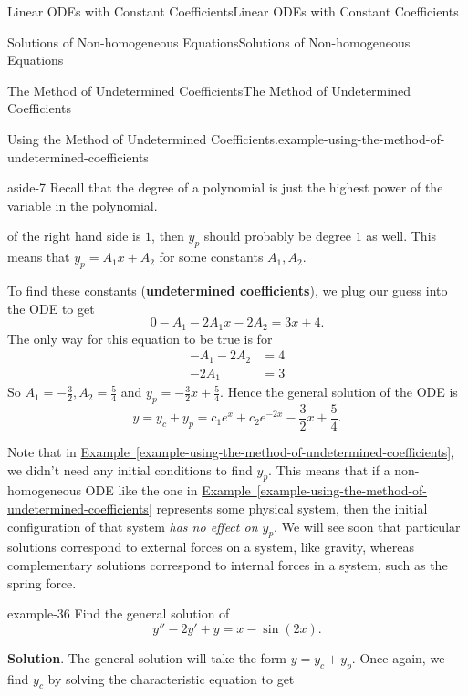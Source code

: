\documentclass[10pt,]{book}
\newcommand{\terminology}[1]{\textbf{#1}}
\numberwithin{equation}{section}
\newcommand{\amp}{&}
\begin{document}
\begin{chapterptx}{Linear ODEs with Constant Coefficients}{}{Linear ODEs with Constant Coefficients}{}{}
\begin{sectionptx}{Solutions of Non-homogeneous Equations}{}{Solutions of Non-homogeneous Equations}{}{}
\begin{subsectionptx}{The Method of Undetermined Coefficients}{}{The Method of Undetermined Coefficients}{}{}
\begin{example}{Using the Method of Undetermined Coefficients.}{example-using-the-method-of-undetermined-coefficients}
\begin{aside}{}{aside-7}
\hypertarget{p-231}{}%
Recall that the degree of a polynomial is just the highest power of the variable in the polynomial.%
\end{aside}
 of the right hand side is \(1\), then \(y_{p}\) should probably be degree \(1\) as well. This means that \(y_{p} = A_{1}x + A_{2}\) for some constants \(A_{1},A_{2}\).%
\par
\hypertarget{p-232}{}%
To find these constants (\terminology{undetermined coefficients}), we plug our guess into the ODE to get%
\begin{equation*}
0 - A_{1} - 2A_{1}x - 2A_{2} = 3x + 4.
\end{equation*}
The only way for this equation to be true is for%
\begin{align*}
-A_{1} - 2A_{2} \amp = 4 \\
-2A_{1} \amp = 3
\end{align*}
So \(A_{1} = -\frac{3}{2}, A_{2} = \frac{5}{4}\) and \(y_{p} = -\frac{3}{2}x + \frac{5}{4}\). Hence the general solution of the ODE is%
\begin{equation*}
y = y_{c} + y_{p} = c_{1}e^{x} + c_{2}e^{-2x} - \frac{3}{2}x + \frac{5}{4}.
\end{equation*}
%
\end{example}
\hypertarget{p-233}{}%
Note that in \hyperref[example-using-the-method-of-undetermined-coefficients]{Example~\ref{example-using-the-method-of-undetermined-coefficients}}, we didn't need any initial conditions to find \(y_{p}\). This means that if a non-homogeneous ODE like the one in \hyperref[example-using-the-method-of-undetermined-coefficients]{Example~\ref{example-using-the-method-of-undetermined-coefficients}} represents some physical system, then the initial configuration of that system \emph{has no effect on \(y_{p}\)}. We will see soon that particular solutions correspond to external forces on a system, like gravity, whereas complementary solutions correspond to internal forces in a system, such as the spring force.%
\begin{example}{}{example-36}%
\hypertarget{p-234}{}%
Find the general solution of%
\begin{equation*}
y'' - 2y' + y = x - \sin(2x).
\end{equation*}
%
\par\smallskip%
\noindent\textbf{Solution}.\hypertarget{solution-33}{}\quad%
\hypertarget{p-235}{}%
The general solution will take the form \(y = y_{c} + y_{p}\). Once again, we find \(y_{c}\) by solving the characteristic equation to get%
\begin{equation*}

\end{equation*}
\end{example}
\end{subsectionptx}
\end{sectionptx}
\end{chapterptx}
\end{document}
